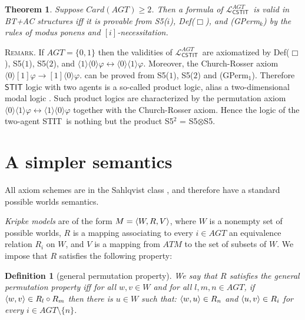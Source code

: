 \documentclass{article}
\newtheorem{definition}{Definition}
\newtheorem{theorem}{Theorem}
\newenvironment{remark}{\medskip\noindent \textsc{Remark.}} {\medskip}
\renewcommand{\phi}{\varphi}
\newcommand{\card}[1]{\mathit{Card}(#1)}           \newcommand{\ext}[1]{|#1|}
\newcommand{\eqv}{\leftrightarrow}      \newcommand{\imp}{\rightarrow}          \newcommand{\subfml}{\mathit{sf}}
\newcommand{\cstit}[1]{[{#1}]}           \newcommand{\poscstit}[1]{\langle {#1} \rangle}    \newcommand{\dstit}[2]{[{#1}\ \mathit{dstit}\! :{#2}]}
\newcommand{\atmset}{\ensuremath{\mathit{ATM}}}        \newcommand{\actset}{\ensuremath{\mathit{ACT}}}        \newcommand{\evtset}{\ensuremath{\mathit{EVT}}}
\newcommand{\agtset}{\ensuremath{\mathit{AGT}}}
\newcommand{\STIT} {{\textsf{STIT}}}              \newcommand{\CSTIT}{{\textsf{CSTIT}}}            \newcommand{\DSTIT}{{\textsf{DSTIT}}}
\newcommand{\LCSTIT}{$\mathcal{L}_{\mathsf{CSTIT}}^\agtset$}
\begin{document}
\begin{theorem}\label{cool-theo}
Suppose $\card{\agtset} \geq 2$.
Then a formula of \LCSTIT\ is valid in BT+AC structures
iff it is provable from
S5($i$),        
Def($\Box$),    
and (GPerm$_k$)                 
by the rules of modus ponens and $\cstit{i}$-necessitation.
\end{theorem}

\begin{remark}
If $\agtset = \{0,1\}$ then the validities of \LCSTIT\ are axiomatized by Def($\Box$),
S5($1$), S5($2$), and
$\poscstit{1} \poscstit{0} \phi  \eqv \poscstit{0} \poscstit{1} \phi $.
Moreover, the Church-Rosser axiom
$\poscstit{0} \cstit{1} \phi \imp \cstit{1} \poscstit{0} \phi$.
can be proved from S5($1$), S5($2$) and (GPerm$_1$).
Therefore $\STIT$ logic with two agents is a so-called product logic,
alias a two-dimensional modal logic \cite{Marx99,GabbayEtAl03}.
Such product logics are characterized by the permutation axiom
$\poscstit{0} \poscstit{1} \phi \eqv \poscstit{1} \poscstit{0} \phi  $
together with the Church-Rosser axiom.
Hence the logic of the two-agent \STIT\ is nothing but the product
S5$^2$ = S5$\otimes$S5.
\end{remark}





\goodbreak
\section{A simpler semantics}\label{sec:newSemantics}


All axiom schemes are in the Sahlqvist class \cite{Blackburn:2001:ML},
and therefore have a standard possible worlds semantics.

\emph{Kripke models} are of the form
$M = \langle W, R, V \rangle $, where
$W$ is a nonempty set of possible worlds,
$R$ is a mapping associating to every $i \in \agtset$ an equivalence relation $R_i$ on $W$,
and $V$ is a mapping from $\atmset$ to the set of subsets of $W$.
We impose that $R$ satisfies the following property:

\begin{definition}[general permutation property]
We say that $R$ satisfies the \emph{general permutation property} iff
for all $w,v \in W$ and for all $l,m,n \in \agtset$,
if $\langle w,v \rangle \in R_l \circ R_m $ then there is $u \in W$ such that:
$\langle w,u \rangle \in R_n $ and $\langle u,v \rangle\in R_i $
for every $i \in \agtset \setminus \{n\}$.
\end{definition}
\end{document}
